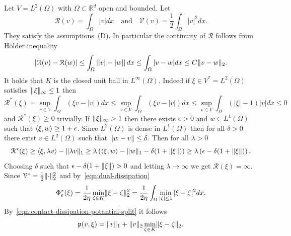 Let $V=L^2(\Omega)$ with $\Omega\subset\mathbb{R}^d$ open and bounded. Let
\begin{equation*}
\mathcal{R}(v)=\int_\Omega|v|dx\quad\text{and}\quad\mathcal{V}(v)=\frac{1}{2}\int_\Omega|v|^2dx.
\end{equation*}
They satisfy the assumptions~(D). In particular the continuity of $\mathcal{R}$ follows from H\"older inequality
\begin{equation*}
|\mathcal{R}(v)-\mathcal{R}(w)|\le\int_\Omega\left||v|-|w|\right|dx\le\int_\Omega|v-w|dx\le C\lVert v-w\rVert_2.
\end{equation*}
It holds that $K$ is the closed unit ball in $L^\infty(\Omega)$. Indeed if $\xi\in V^*=L^2(\Omega)$ satisfies $\lVert\xi\rVert_\infty\le1$ then
\begin{equation*}
\mathcal{R}^*(\xi)=\sup_{v\in V}\int_\Omega\left(\xi v-|v|\right)dx\le\sup_{v\in V}\int_\Omega\left(\xi v-|v|\right)dx\le\sup_{v\in V}\int_\Omega(|\xi|-1)|v|dx\le0
\end{equation*}
and $\mathcal{R}^*(\xi)\ge0$ trivially. If $\lVert\xi\rVert_\infty>1$ then there exists $\epsilon>0$ and $w\in L^1(\Omega)$ such that $\langle\xi,w\rangle\ge1+\epsilon$. Since $L^2(\Omega)$ is dense in $L^1(\Omega)$ then for all $\delta>0$ there exist $v\in L^2(\Omega)$ such that $\lVert w-v\rVert\le\delta$. Then for all $\lambda>0$
\begin{equation*}
\mathcal{R}^*(\xi)\ge\langle\xi,\lambda v\rangle-\lVert\lambda v\rVert_1\ge\lambda\left(\langle\xi,w\rangle-\lVert w\rVert_1-\delta(1+\lVert\xi\rVert)\right)\ge\lambda\left(\epsilon-\delta(1+\lVert\xi\rVert)\right).
\end{equation*}
Choosing $\delta$ such that $\epsilon-\delta(1+\lVert\xi\rVert)>0$ and letting $\lambda\to\infty$ we get $\mathcal{R}(\xi)=\infty$. Since $\mathcal{V}^*=\frac{1}{2}\lVert\cdot\rVert_2^2$ and by~\eqref{eqn:dual-dissipation}
\begin{equation*}
\Phi_\epsilon^*(\xi)=\frac{1}{2\eta}\min_{\zeta\in K}\lVert\xi-\zeta\rVert_2^2=\frac{1}{2\eta}\int_\Omega\min_{|\zeta|\le1}|\xi-\zeta|^2dx.
\end{equation*}
By~\eqref{eqn:contact-dissipation-potantial-split} it follows
\begin{equation*}
\mathfrak{p}(v,\xi)=\lVert v\rVert_1+\lVert v\rVert_2\min_{\zeta\in K}\lVert\xi-\zeta\rVert_2.
\end{equation*}